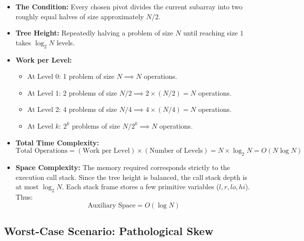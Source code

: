 \documentclass[10pt,journal,compsoc,onecolumn]{IEEEtran}
\begin{document}
\begin{itemize}
    \item \textbf{The Condition:} Every chosen pivot divides the current subarray into two roughly equal halves of size approximately $N/2$.
    \item \textbf{Tree Height:} Repeatedly halving a problem of size $N$ until reaching size $1$ takes $\log_2 N$ levels.
    \item \textbf{Work per Level:}
    \begin{itemize}
        \item At Level 0: 1 problem of size $N \implies N$ operations.
        \item At Level 1: 2 problems of size $N/2 \implies 2 \times (N/2) = N$ operations.
        \item At Level 2: 4 problems of size $N/4 \implies 4 \times (N/4) = N$ operations.
        \item At Level $k$: $2^k$ problems of size $N/2^k \implies N$ operations.
    \end{itemize}
    \item \textbf{Total Time Complexity:}
    \[
    \text{Total Operations} = (\text{Work per Level}) \times (\text{Number of Levels}) = N \times \log_2 N = O(N \log N)
    \]
    \item \textbf{Space Complexity:} The memory required corresponds strictly to the execution call stack. Since the tree height is balanced, the call stack depth is at most $\log_2 N$. Each stack frame stores a few primitive variables ($l, r, lo, hi$). Thus:
    \[
    \text{Auxiliary Space} = O(\log N)
    \]
\end{itemize}

\subsection{Worst-Case Scenario: Pathological Skew}
\end{document}
